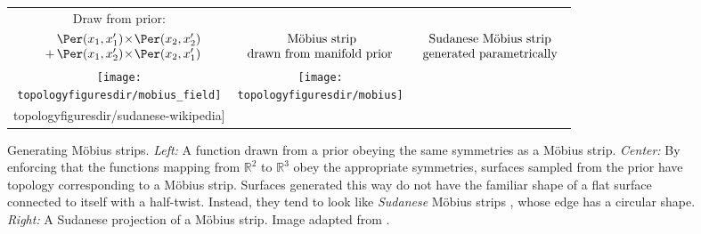 \begin{figure}
\begin{tabular}[t]{ccc}
\centering
Draw from \gp{} prior: &  &  \\
$\begin{array}{l@{}l@{}}
&\Per(x_1, x_1') \kerntimes \Per(x_2, x_2') \\
          \kernplus & \Per(x_1, x_2') \kerntimes \Per(x_2, x_1')
\end{array}$
& $\begin{array}{c} \textnormal{ M\"{o}bius strip}  \\ \textnormal{drawn from manifold prior}  \end{array}$
 & $\begin{array}{c} \textnormal{Sudanese M\"{o}bius strip}  \\ \textnormal{generated parametrically}  \end{array}$\\
\texttt{[image: \\topologyfiguresdir/mobius\_field]} & 
\texttt{[image: \\topologyfiguresdir/mobius]} &
\raisebox{1cm}{\texttt{[image: \\topologyfiguresdir/sudanese-wikipedia]}}
\end{tabular}
\caption[Generating M\"{o}bius strips]{Generating M\"{o}bius strips.
\emph{Left:} A function drawn from a \sgp{} prior obeying the same symmetries as a M\"{o}bius strip.
\emph{Center:} By enforcing that the functions mapping from $\mathbb{R}^2$ to $\mathbb{R}^3$ obey the appropriate symmetries, surfaces sampled from the prior have topology corresponding to a M\"{o}bius strip.
Surfaces generated this way do not have the familiar shape of a flat surface connected to itself with a half-twist.
Instead, they tend to look like \emph{Sudanese} M\"{o}bius strips \citep{sudanese1984}, whose edge has a circular shape.
\emph{Right:} A Sudanese projection of a M\"{o}bius strip.
Image adapted from \citep{sudanesepict}.
}
\label{fig:mobius}
\end{figure}

